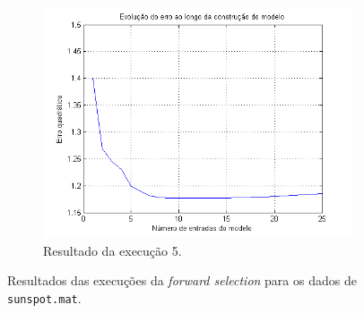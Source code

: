 \begin{figure}[H]
			\begin{subfigure}{.5\textwidth}
				  \centering
				  \includegraphics[width=1\linewidth]{image/forward5}
				  \caption{Resultado da execução 5.}
				  \label{forward5}
				\end{subfigure}	
			
			\caption{Resultados das execuções da \textit{forward selection} para os
			dados de \texttt{sunspot.mat}.}
			\label{fig:forw}
			\end{figure}
			
		\FloatBarrier
		

